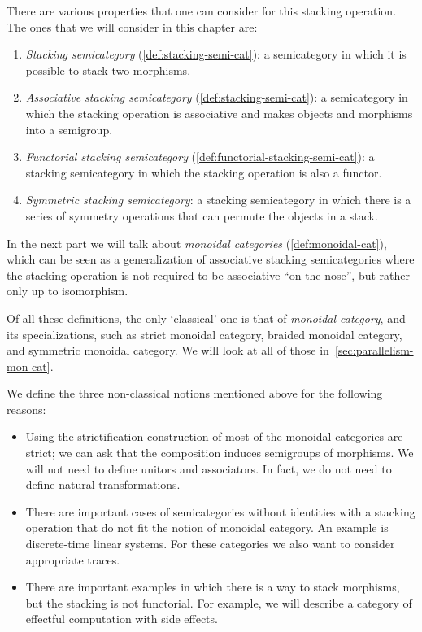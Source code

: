 There are various properties that one can consider for this stacking operation.
The ones that we will consider in this chapter are:
%
\begin{enumerate}
    \item \emph{Stacking semicategory} (\cref{def:stacking-semi-cat}): a semicategory in which it is possible to stack two morphisms.
    \item \emph{Associative stacking semicategory} (\cref{def:stacking-semi-cat}): a semicategory in which the stacking operation is associative and makes objects and morphisms into a semigroup.
    \item \emph{Functorial stacking semicategory} (\cref{def:functorial-stacking-semi-cat}): a stacking semicategory in which the stacking operation is also a functor.
    \item \emph{Symmetric stacking semicategory}: a stacking semicategory in which there is a series of symmetry operations that can permute the objects in a stack.
\end{enumerate}
%
In the next part we will talk about \emph{monoidal categories} (\cref{def:monoidal-cat}), which can be seen as a generalization of associative stacking semicategories where the stacking operation is not required to be associative ``on the nose'', but rather only up to isomorphism.

\begin{remark}
    Of all these definitions, the only `classical' one is that of \emph{monoidal category}, and its specializations, such as strict monoidal category, braided monoidal category, and symmetric monoidal category.
    We will look at all of those in~\cref{sec:parallelism-mon-cat}.

    We define the three non-classical notions mentioned above for the following reasons:
    \begin{itemize}
        \item Using the strictification construction of \SetL most of the monoidal categories are strict; we can ask that the composition induces semigroups of morphisms.
              We will not need to define unitors and associators.
              In fact, we do not need to define natural transformations.
        \item There are important cases of semicategories without identities with a stacking operation that do not fit the notion of monoidal category.
              An example is discrete-time linear systems.
              For these categories we also want to consider appropriate traces.
        \item There are important examples in which there is a way to stack morphisms, but the stacking is not functorial.
              For example, we will describe a category of effectful computation with side effects.
    \end{itemize}
\end{remark}

